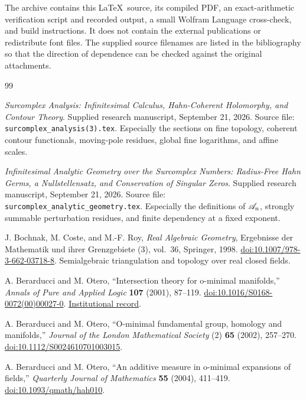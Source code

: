 \documentclass[11pt,letterpaper]{article}
\theoremstyle{definition}
\theoremstyle{remark}
\numberwithin{equation}{section}
\begin{document}
The archive contains this \LaTeX\ source, its compiled PDF, an exact-arithmetic verification script and recorded output, a small Wolfram Language cross-check, and build instructions. It does not contain the external publications or redistribute font files. The supplied source filenames are listed in the bibliography so that the direction of dependence can be checked against the original attachments.

\begin{thebibliography}{99}

\emph{Surcomplex Analysis: Infinitesimal Calculus, Hahn-Coherent Holomorphy, and Contour Theory}.
Supplied research manuscript, September 21, 2026.
Source file: \texttt{surcomplex\_analysis(3).tex}.
Especially the sections on fine topology, coherent contour functionals, moving-pole residues, global fine logarithms, and affine scales.

\emph{Infinitesimal Analytic Geometry over the Surcomplex Numbers: Radius-Free Hahn Germs, a Nullstellensatz, and Conservation of Singular Zeros}.
Supplied research manuscript, September 21, 2026.
Source file: \texttt{surcomplex\_analytic\_geometry.tex}.
Especially the definitions of $\mathscr A_n$, strongly summable perturbation residues, and finite dependency at a fixed exponent.

J. Bochnak, M. Coste, and M.-F. Roy,
\emph{Real Algebraic Geometry}, Ergebnisse der Mathematik und ihrer Grenzgebiete (3), vol.~36, Springer, 1998.
\href{https://doi.org/10.1007/978-3-662-03718-8}{doi:10.1007/978-3-662-03718-8}.
Semialgebraic triangulation and topology over real closed fields.

A. Berarducci and M. Otero,
``Intersection theory for o-minimal manifolds,''
\emph{Annals of Pure and Applied Logic} \textbf{107} (2001), 87--119.
\href{https://doi.org/10.1016/S0168-0072(00)00027-0}{doi:10.1016/S0168-0072(00)00027-0}.
\href{https://arpi.unipi.it/handle/11568/186193}{Institutional record}.

A. Berarducci and M. Otero,
``O-minimal fundamental group, homology and manifolds,''
\emph{Journal of the London Mathematical Society} (2) \textbf{65} (2002), 257--270.
\href{https://doi.org/10.1112/S0024610701003015}{doi:10.1112/S0024610701003015}.

A. Berarducci and M. Otero,
``An additive measure in o-minimal expansions of fields,''
\emph{Quarterly Journal of Mathematics} \textbf{55} (2004), 411--419.
\href{https://doi.org/10.1093/qmath/hah010}{doi:10.1093/qmath/hah010}.


\end{thebibliography}
\end{document}
